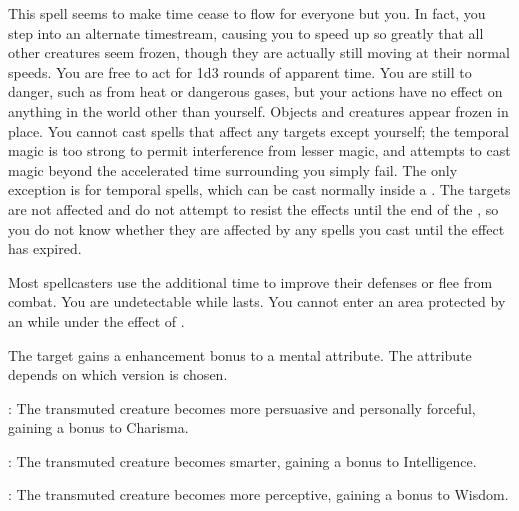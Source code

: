 \begin{spellheader}
\end{spellheader}
\begin{spelleffects}
    \spelleffect This spell seems to make time cease to flow for everyone but you. In fact, you step into an alternate timestream, causing you to speed up so greatly that all other creatures seem frozen, though they are actually still moving at their normal speeds. You are free to act for 1d3 rounds of apparent time. You are still \vulnerable to danger, such as from heat or dangerous gases, but your actions have no effect on anything in the world other than yourself. Objects and creatures appear frozen in place. You cannot cast spells that affect any targets except yourself; the temporal magic is too strong to permit interference from lesser magic, and attempts to cast magic beyond the accelerated time surrounding you simply fail. The only exception is for temporal spells, which can be cast normally inside a . The targets are not affected and do not attempt to resist the effects until the end of the , so you do not know whether they are affected by any spells you cast until the effect has expired.
\end{spelleffects}
\begin{spellfooter}
    \spellnotes Most spellcasters use the additional time to improve their defenses or flee from combat. You are undetectable while  lasts. You cannot enter an area protected by an  while under the effect of .
\end{spellfooter}

\begin{spellheader}
    \spellrng{\rngtouch}
    \spelldur{\durshort}
\end{spellheader}
\begin{spelleffects}
    \spelleffect The target gains a  enhancement bonus to a mental attribute. The attribute depends on which version is chosen.
    \par {}: The transmuted creature becomes more persuasive and personally forceful, gaining a bonus to Charisma.
    \par {}: The transmuted creature becomes smarter, gaining a bonus to Intelligence.
    \par {}: The transmuted creature becomes more perceptive, gaining a bonus to Wisdom.
\end{spelleffects}
\begin{spellfooter}

\end{spellfooter}

